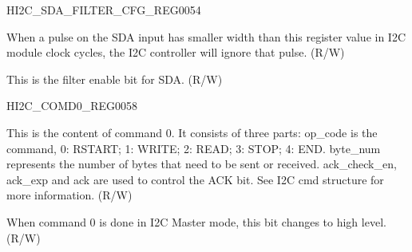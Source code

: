 \begin{register}{H}{I2C\_SDA\_FILTER\_CFG\_REG}{\hexprefix{}0054}\label{regdesc:I2CSDAFILTERCFGREG}
%
%
%
\regnewline%
\begin{regdesc}\begin{reglist}
\label{fielddesc:I2CSDAFILTERTHRES}\item [I2C\_SDA\_FILTER\_THRES] When a pulse on the SDA input has smaller width than this register value in I2C module clock cycles, the I2C controller will ignore that pulse. (R/W)
\label{fielddesc:I2CSDAFILTEREN}\item [I2C\_SDA\_FILTER\_EN] This is the filter enable bit for SDA. (R/W)
\end{reglist}\end{regdesc}
\end{register}


\begin{register}{H}{I2C\_COMD0\_REG}{\hexprefix{}0058}\label{regdesc:I2CCOMD0REG}
%
%
%
\regnewline%
\begin{regdesc}\begin{reglist}
\label{fielddesc:I2CCOMMAND0}\item [I2C\_COMMAND0] This is the content of command 0. It consists of three parts:
op\_code is the command, 0: RSTART; 1: WRITE; 2: READ; 3: STOP; 4: END.
byte\_num represents the number of bytes that need to be sent or received.
ack\_check\_en, ack\_exp and ack are used to control the ACK bit. See I2C cmd structure for more information. (R/W)
\label{fielddesc:I2CCOMMAND0DONE}\item [I2C\_COMMAND0\_DONE] When command 0 is done in I2C Master mode, this bit changes to high level. (R/W)
\end{reglist}\end{regdesc}
\end{register}


